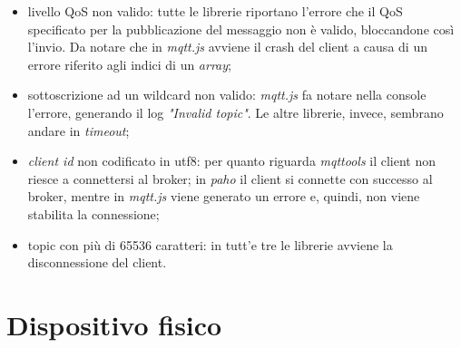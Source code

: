 \documentclass[binding=0.6cm,TFA]{sapthesis}
\begin{document}
\begin{large}
\begin{itemize}
\item livello QoS non valido: tutte le librerie riportano l'errore che il QoS specificato per la pubblicazione del messaggio non è valido, bloccandone così l'invio. Da notare che in \textit{mqtt.js} avviene il crash del client a causa di un errore riferito agli indici di un \textit{array};
\item sottoscrizione ad un wildcard non valido: \textit{mqtt.js} fa notare nella console l'errore, generando il log \textit{"Invalid topic"}. Le altre librerie, invece, sembrano andare in \textit{timeout};
\item \textit{client id} non codificato in utf8: per quanto riguarda \textit{mqttools} il client non riesce a connettersi al broker; in \textit{paho} il client si connette con successo al broker, mentre in \textit{mqtt.js} viene generato un errore e, quindi, non viene stabilita la connessione;
\item topic con più di 65536 caratteri: in tutt'e tre le librerie avviene la disconnessione del client.
\end{itemize}


\section{Dispositivo fisico}


\end{large}

\cleardoublepage
{}
\end{document}
